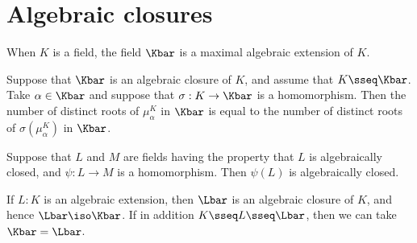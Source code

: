 \documentclass[a4paper]{article}
\begin{document}
\section{Algebraic closures}


\begin{tcorollary}
  When \( K \) is a field, the field \( \Kbar \) is a maximal algebraic extension of \( K \).
\end{tcorollary}


\begin{tcorollary}
  Suppose that \( \Kbar \) is an algebraic closure of \( K \), and assume that \( K\sseq \Kbar \).
  Take \( \alpha\in \Kbar \) and suppose that \( \sigma:K\to \Kbar \) is a homomorphism.
  Then the number of distinct roots of \( \mu_\alpha^K \) in \( \Kbar \) is equal to the number of distinct roots of \( \sigma(\mu_\alpha^K) \) in \( \Kbar \).
\end{tcorollary}

\begin{tproposition}
  Suppose that \( L \) and \( M \) are fields having the property that \( L \) is algebraically closed, and \( \psi : L \to M \) is a homomorphism.
  Then \( \psi(L) \) is algebraically closed.
\end{tproposition}

\begin{tproposition}
  If \( L:K \) is an algebraic extension, then \( \Lbar \) is an algebraic closure of \( K \), and hence \( \Lbar\iso\Kbar \).
  If in addition \( K\sseq L\sseq \Lbar \), then we can take \( \Kbar = \Lbar \).
\end{tproposition}
\end{document}
